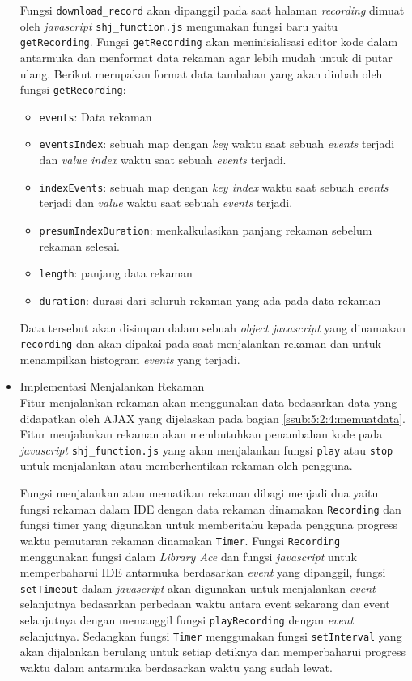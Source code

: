 \begin{itemize}
    Fungsi \verb|download_record| akan dipanggil pada saat halaman \textit{recording} dimuat oleh \textit{javascript} \verb|shj_function.js| mengunakan fungsi baru yaitu \verb|getRecording|. Fungsi \verb|getRecording| akan meninisialisasi editor kode dalam antarmuka dan menformat data rekaman agar lebih mudah untuk di putar ulang. Berikut merupakan format data tambahan yang akan diubah oleh fungsi \verb|getRecording|:

    \begin{itemize}
        \item \verb|events|: Data rekaman
        \item \verb|eventsIndex|: sebuah map dengan \textit{key} waktu saat sebuah \textit{events} terjadi dan \textit{value index} waktu saat sebuah \textit{events} terjadi.
        \item \verb|indexEvents|: sebuah map dengan \textit{key index} waktu saat sebuah \textit{events} terjadi dan \textit{value} waktu saat sebuah \textit{events} terjadi.
        \item \verb|presumIndexDuration|: menkalkulasikan panjang rekaman sebelum rekaman selesai.
        \item \verb|length|: panjang data rekaman
        \item \verb|duration|: durasi dari seluruh rekaman yang ada pada data rekaman
    \end{itemize}

    Data tersebut akan disimpan dalam sebuah \textit{object javascript} yang dinamakan \verb|recording| dan akan dipakai pada saat menjalankan rekaman dan untuk menampilkan histogram \textit{events} yang terjadi.

    \item Implementasi Menjalankan Rekaman \\
    Fitur menjalankan rekaman akan menggunakan data bedasarkan data yang didapatkan oleh AJAX yang dijelaskan pada bagian \ref{ssub:5:2:4:memuatdata}. Fitur menjalankan rekaman akan membutuhkan penambahan kode pada \textit{javascript} \verb|shj_function.js| yang akan menjalankan fungsi \verb|play| atau \verb|stop| untuk menjalankan atau memberhentikan rekaman oleh pengguna. 

    Fungsi menjalankan atau mematikan rekaman dibagi menjadi dua yaitu fungsi rekaman dalam IDE dengan data rekaman dinamakan \verb|Recording| dan fungsi timer yang digunakan untuk memberitahu kepada pengguna progress waktu pemutaran rekaman dinamakan \verb|Timer|.
    Fungsi \verb|Recording| menggunakan fungsi dalam \textit{Library Ace} dan fungsi \textit{javascript} untuk memperbaharui IDE antarmuka berdasarkan \textit{event} yang dipanggil, fungsi \verb|setTimeout| dalam \textit{javascript} akan digunakan untuk menjalankan \textit{event} selanjutnya bedasarkan perbedaan waktu antara event sekarang dan event selanjutnya dengan memanggil fungsi \verb|playRecording| dengan \textit{event} selanjutnya. Sedangkan fungsi \verb|Timer| menggunakan fungsi \verb|setInterval| yang akan dijalankan berulang untuk setiap detiknya dan memperbaharui progress waktu dalam antarmuka berdasarkan waktu yang sudah lewat.


\end{itemize}
